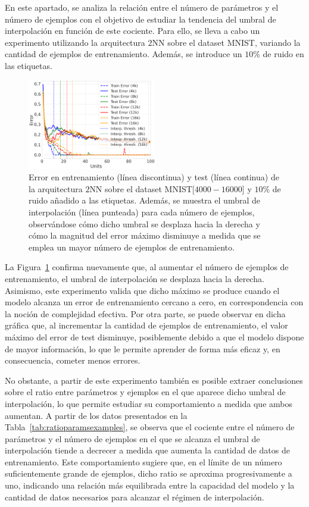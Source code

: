 En este apartado, se analiza la relación entre el número de parámetros y el número de ejemplos con el objetivo de estudiar la tendencia del umbral de interpolación en función de este cociente. Para ello, se lleva a cabo un experimento utilizando la arquitectura $2$NN sobre el dataset MNIST, variando la cantidad de ejemplos de entrenamiento. Además, se introduce un $10\%$ de ruido en las etiquetas.

\begin{figure}[h]
    \centering
    \includegraphics[width=0.5\textwidth]{img/experiments/ratioparamsexamples.png}
    \caption[Ratio parámetros frente a número de ejemplos en el doble descenso.]{Error en entrenamiento (línea discontinua) y test (línea continua) de la arquitectura $2$NN sobre el dataset MNIST[$4000-16000$] y $10$\% de ruido añadido a las etiquetas. Además, se muestra el umbral de interpolación (línea punteada) para cada número de ejemplos, observándose cómo dicho umbral se desplaza hacia la derecha y cómo la magnitud del error máximo disminuye a medida que se emplea un mayor número de ejemplos de entrenamiento.}\label{fig:ratioparamsexamples}
\end{figure}

La Figura~\ref{fig:ratioparamsexamples} confirma nuevamente que, al aumentar el número de ejemplos de entrenamiento, el umbral de interpolación se desplaza hacia la derecha. Asimismo, este experimento valida que dicho máximo se produce cuando el modelo alcanza un error de entrenamiento cercano a cero, en correspondencia con la noción de complejidad efectiva. Por otra parte, se puede observar en dicha gráfica que, al incrementar la cantidad de ejemplos de entrenamiento, el valor máximo del error de test disminuye, posiblemente debido a que el modelo dispone de mayor información, lo que le permite aprender de forma más eficaz y, en consecuencia, cometer menos errores.

No obstante, a partir de este experimento también es posible extraer conclusiones sobre el ratio entre parámetros y ejemplos en el que aparece dicho umbral de interpolación, lo que permite estudiar su comportamiento a medida que ambos aumentan. A partir de los datos presentados en la Tabla~\ref{tab:ratioparamsexamples}, se observa que el cociente entre el número de parámetros y el número de ejemplos en el que se alcanza el umbral de interpolación tiende a decrecer a medida que aumenta la cantidad de datos de entrenamiento. Este comportamiento sugiere que, en el límite de un número suficientemente grande de ejemplos, dicho ratio se aproxima progresivamente a uno, indicando una relación más equilibrada entre la capacidad del modelo y la cantidad de datos necesarios para alcanzar el régimen de interpolación. 

